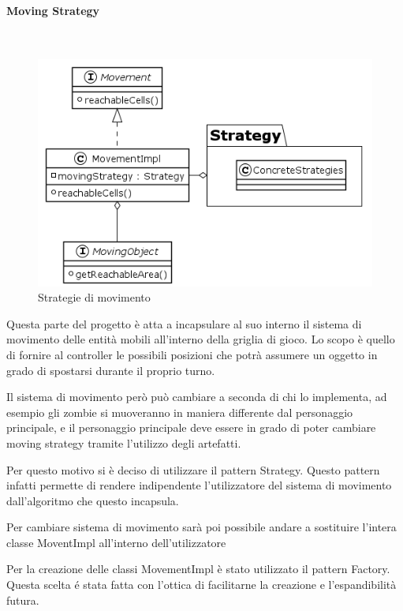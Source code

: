 \documentclass[a4paper,titlepage,12pt]{article}
\begin{document}
\paragraph{Moving Strategy}
\par \noindent \\
\begin{figure}[H]
    \centering
    \includegraphics[scale=0.7]{img/uml/Movement.png}
    \caption{Strategie di movimento}
    \label{fig: Strategie di movimento}
\end{figure}
\par \noindent Questa parte del progetto è atta a incapsulare al suo interno il sistema di movimento delle entità mobili all’interno della griglia di gioco. Lo scopo è quello di fornire al controller le possibili posizioni che potrà assumere un oggetto in grado di spostarsi durante il proprio turno.
\par \noindent Il sistema di movimento però può cambiare a seconda di chi lo implementa, ad esempio gli zombie si muoveranno in maniera differente dal personaggio principale, e il personaggio principale deve essere in grado di poter cambiare moving strategy tramite l’utilizzo degli artefatti. 
\par \noindent Per questo motivo si è deciso di utilizzare il pattern Strategy. Questo pattern infatti permette di rendere indipendente l’utilizzatore del sistema di movimento dall'algoritmo che questo incapsula. 
\par \noindent Per cambiare sistema di movimento sarà poi possibile  andare a sostituire l’intera classe MoventImpl all’interno dell’utilizzatore 
\par \noindent Per la creazione delle classi MovementImpl è stato utilizzato il pattern Factory. Questa scelta é stata fatta con l’ottica di facilitarne la creazione e l’espandibilità futura.
\end{document}
